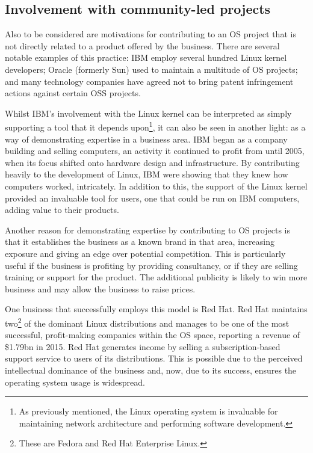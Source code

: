 \documentclass[a4paper]{article}
\begin{document}
\subsection{Involvement with community-led projects}

Also to be considered are motivations for contributing to an OS project that is not directly related to a product offered by the business. There are several notable examples of this practice: IBM employ several hundred Linux kernel developers\cite{ibmlinux}; Oracle (formerly Sun) used to maintain a multitude of OS projects\cite{howopen}; and many technology companies have agreed not to bring patent infringement actions against certain OSS projects\cite{kempcurrentdev}.

Whilst IBM’s involvement with the Linux kernel can be interpreted as simply supporting a tool that it depends upon\footnote{As previously mentioned, the Linux operating system is invaluable for maintaining network architecture and performing software development.}, it can also be seen in another light: as a way of demonstrating expertise in a business area. IBM began as a company building and selling computers, an activity it continued to profit from until 2005\cite{ibmlinux}, when its focus shifted onto hardware design and infrastructure\cite{lufthansa}. By contributing heavily to the development of Linux, IBM were showing that they knew how computers worked, intricately. In addition to this, the support of the Linux kernel provided an invaluable tool for users, one that could be run on IBM computers, adding value to their products.

Another reason for demonstrating expertise by contributing to OS projects is that it establishes the business as a known brand in that area, increasing exposure and giving an edge over potential competition. This is particularly useful if the business is profiting by providing consultancy, or if they are selling training or support for the product. The additional publicity is likely to win more business and may allow the business to raise prices.

One business that successfully employs this model is Red Hat\cite{redhat}. Red Hat maintains two\footnote{These are Fedora and Red Hat Enterprise Linux.} of the dominant Linux distributions\cite{distros} and manages to be one of the most successful, profit-making companies within the OS space, reporting a revenue of \$1.79bn in 2015\cite{redhatmoney}. Red Hat generates income by selling a subscription-based support service to users of its distributions. This is possible due to the perceived intellectual dominance of the business and, now, due to its success, ensures the operating system usage is widespread.
\end{document}
